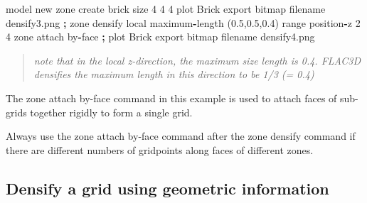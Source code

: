 \documentclass[a4paper, nobind]{templates/ociamthesis}
\newenvironment{Shaded}{\begin{snugshade}}{\end{snugshade}}
\newcommand{\BuiltInTok}[1]{#1}
\newcommand{\DecValTok}[1]{\textcolor[rgb]{0.00,0.00,0.81}{#1}}
\newcommand{\FloatTok}[1]{\textcolor[rgb]{0.00,0.00,0.81}{#1}}
\newcommand{\NormalTok}[1]{#1}
\newcommand{\OperatorTok}[1]{\textcolor[rgb]{0.81,0.36,0.00}{\textbf{#1}}}
\newcommand{\StringTok}[1]{\textcolor[rgb]{0.31,0.60,0.02}{#1}}
\renewenvironment{Shaded}
{
  \vspace{10pt}%
  \begin{snugshade}%
}{%
  \end{snugshade}%
  \vspace{8pt}%
}
\begin{document}
\begin{Shaded}
\begin{Highlighting}[]
\NormalTok{model new}
\NormalTok{zone create brick size }\DecValTok{4} \DecValTok{4} \DecValTok{4}
\NormalTok{plot }\StringTok{\textquotesingle{}Brick\textquotesingle{}}\NormalTok{ export bitmap filename }\StringTok{\textquotesingle{}densify3.png\textquotesingle{}}
\OperatorTok{;}
\NormalTok{zone densify local maximum}\OperatorTok{{-}}\NormalTok{length (}\FloatTok{0.5}\NormalTok{,}\FloatTok{0.5}\NormalTok{,}\FloatTok{0.4}\NormalTok{) }\BuiltInTok{range}\NormalTok{ position}\OperatorTok{{-}}\NormalTok{z }\DecValTok{2} \DecValTok{4}
\NormalTok{zone attach by}\OperatorTok{{-}}\NormalTok{face}
\OperatorTok{;}
\NormalTok{plot }\StringTok{\textquotesingle{}Brick\textquotesingle{}}\NormalTok{ export bitmap filename }\StringTok{\textquotesingle{}densify4.png\textquotesingle{}}
\end{Highlighting}
\end{Shaded}

\begin{quote}
\emph{note that in the local z-direction, the maximum size length is 0.4. FLAC3D densifies the maximum length in this direction to be 1/3 (= 0.4)}
\end{quote}

The zone attach by-face command in this example is used to attach faces of sub-grids together rigidly to form a single grid.

Always use the zone attach by-face command after the zone densify
command if there are different numbers of gridpoints along faces of
different zones.

\hypertarget{densify-a-grid-using-geometric-information}{%
\subsection{Densify a grid using geometric information}\label{densify-a-grid-using-geometric-information}}
\end{document}
